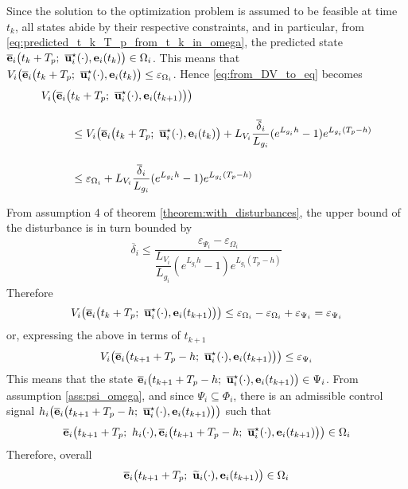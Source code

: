 \begin{gg_box}
Since the solution to the optimization problem is assumed to be feasible
at time $t_k$, all states abide by their respective constraints, and in
particular, from \eqref{eq:predicted_t_k_T_p_from_t_k_in_omega},
the predicted state
$\overline{\vect{e}}_i\big(t_k + T_p;\ \overline{\vect{u}}_i^{\star}(\cdot), \vect{e}_i(t_k)\big) \in \Omega_i$.
This means that
$V_i\big(\overline{\vect{e}}_i\big(t_k + T_p;\ \overline{\vect{u}}_i^{\star}(\cdot), \vect{e}_i(t_k)\big) \leq \varepsilon_{\Omega_i}$.
Hence \eqref{eq:from_DV_to_eq} becomes
\begin{align}
  V_i\big(\overline{\vect{e}}_i\big(&t_k + T_p;\ \overline{\vect{u}}_i^{\star}(\cdot), \vect{e}_i(t_{k+1})\big)\big) \\[2.5ex]
  &\leq V_i\big(\overline{\vect{e}}_i\big(t_k + T_p;\ \overline{\vect{u}}_i^{\star}(\cdot), \vect{e}_i(t_k)\big) + L_{V_i} \dfrac{\overline{\delta}_i}{L_{g_i}} (e^{L_{g_i}h} - 1) e^{L_{g_i} (T_p - h)} \\[2.5ex]
  &\leq \varepsilon_{\Omega_i} + L_{V_i} \dfrac{\overline{\delta}_i}{L_{g_i}} (e^{L_{g_i}h} - 1) e^{L_{g_i} (T_p - h)}
\label{eq:from_DV_to_eq_2}
\end{align}

From assumption 4 of theorem \eqref{theorem:with_disturbances},
the upper bound of the disturbance is in turn bounded by
\begin{align}
  \overline{\delta}_i \leq \dfrac{\varepsilon_{\Psi_i} - \varepsilon_{\Omega_i}}{\dfrac{L_{V_i}}{L_{g_i}} (e^{L_{g_i}h} - 1) e^{L_{g_i} (T_p - h)}}
\end{align}
Therefore
\begin{align}
  V_i\big(\overline{\vect{e}}_i\big(t_k + T_p;\ \overline{\vect{u}}_i^{\star}(\cdot), \vect{e}_i(t_{k+1})\big)\big)
  \leq  \varepsilon_{\Omega_i} - \varepsilon_{\Omega_i} + \varepsilon_{\Psi_i} = \varepsilon_{\Psi_i}
\end{align}
or, expressing the above in terms of $t_{k+1}$
\begin{align}
  V_i\big(\overline{\vect{e}}_i\big(t_{k+1} + T_p-h;\ \overline{\vect{u}}_i^{\star}(\cdot), \vect{e}_i(t_{k+1})\big)\big) \leq \varepsilon_{\Psi_i}
\end{align}
This means that the state
$\overline{\vect{e}}_i\big(t_{k+1} + T_p-h;\ \overline{\vect{u}}_i^{\star}(\cdot), \vect{e}_i(t_{k+1})\big) \in \Psi_i$.
From assumption \eqref{ass:psi_omega},
and since $\Psi_i \subseteq \Phi_i$, there is an admissible control signal
$h_i\big(\overline{\vect{e}}_i\big(t_{k+1} + T_p-h;\ \overline{\vect{u}}_i^{\star}(\cdot), \vect{e}_i(t_{k+1})\big)\big)$
such that
\begin{align}
  \overline{\vect{e}}_i\big(t_{k+1} + T_p;\ h_i(\cdot), \overline{\vect{e}}_i\big(t_{k+1} + T_p - h;\ \overline{\vect{u}}_i^{\star}(\cdot), \vect{e}_i(t_{k+1})\big)\big) \in \Omega_i
\end{align}
Therefore, overall
\begin{align}
  \overline{\vect{e}}_i\big(t_{k+1} + T_p;\ \widetilde{\vect{u}}_i(\cdot), \vect{e}_i(t_{k+1}) \big) \in \Omega_i
  \label{eq:feasibility_3}
\end{align}
\qedsymbol
\end{gg_box}
